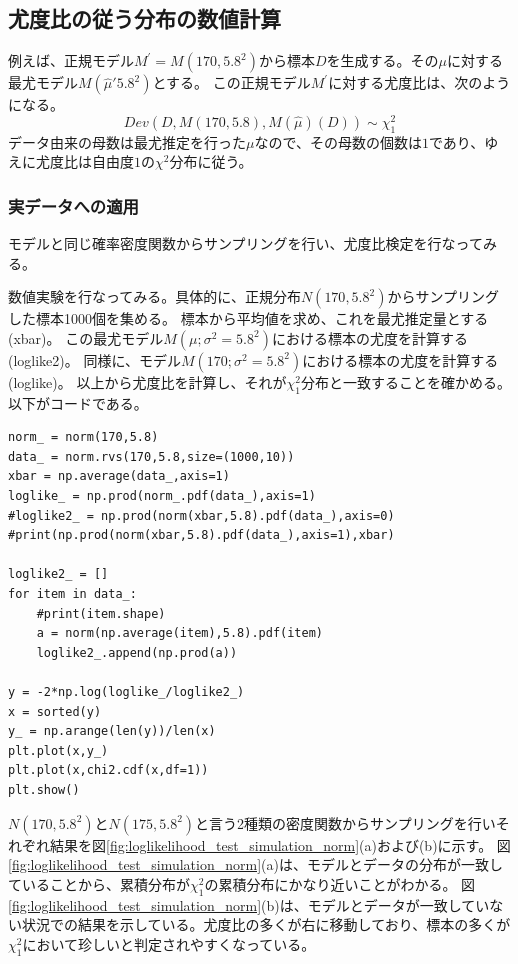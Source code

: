 \subsection{尤度比の従う分布の数値計算}
例えば、正規モデル$M^{'}=M(170,5.8^2)$から標本$D$を生成する。その$\mu$に対する最尤モデル$M(\hat{\mu}\prime5.8^2)$とする。
この正規モデル$M^{'}$に対する尤度比は、次のようになる。
\begin{equation*}
    Dev(D,M(170,5.8),M(\hat{\mu})(D)) \sim \chi^2_1
\end{equation*}
データ由来の母数は最尤推定を行った$\mu$なので、その母数の個数は$1$であり、ゆえに尤度比は自由度$1$の$\chi^2$分布に従う。

\subsubsection{実データへの適用}
モデルと同じ確率密度関数からサンプリングを行い、尤度比検定を行なってみる。

数値実験を行なってみる。具体的に、正規分布$N(170,5.8^2)$からサンプリングした標本1000個を集める。
標本から平均値を求め、これを最尤推定量とする(xbar)。
この最尤モデル$M(\mu;\sigma^2=5.8^2) $における標本の尤度を計算する(loglike2)。
同様に、モデル$M(170;\sigma^2=5.8^2)$における標本の尤度を計算する(loglike)。
以上から尤度比を計算し、それが$\chi^2_1$分布と一致することを確かめる。
以下がコードである。

\begin{lstlisting}
norm_ = norm(170,5.8)
data_ = norm.rvs(170,5.8,size=(1000,10))
xbar = np.average(data_,axis=1)
loglike_ = np.prod(norm_.pdf(data_),axis=1)
#loglike2_ = np.prod(norm(xbar,5.8).pdf(data_),axis=0)
#print(np.prod(norm(xbar,5.8).pdf(data_),axis=1),xbar)

loglike2_ = []
for item in data_:
    #print(item.shape)
    a = norm(np.average(item),5.8).pdf(item)
    loglike2_.append(np.prod(a))

y = -2*np.log(loglike_/loglike2_)
x = sorted(y)
y_ = np.arange(len(y))/len(x)
plt.plot(x,y_)
plt.plot(x,chi2.cdf(x,df=1))
plt.show()

\end{lstlisting}

$N(170,5.8^2)$と$N(175,5.8^2)$と言う2種類の密度関数からサンプリングを行いそれぞれ結果を図\ref{fig:loglikelihood_test_simulation_norm}(a)および(b)に示す。
図\ref{fig:loglikelihood_test_simulation_norm}(a)は、モデルとデータの分布が一致していることから、累積分布が$\chi^2_1$の累積分布にかなり近いことがわかる。
図\ref{fig:loglikelihood_test_simulation_norm}(b)は、モデルとデータが一致していない状況での結果を示している。尤度比の多くが右に移動しており、標本の多くが$\chi^2_1$において珍しいと判定されやすくなっている。


